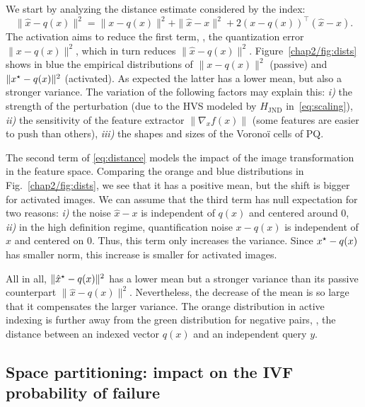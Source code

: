 We start by analyzing the distance estimate considered by the index:
\begin{equation}
    \|\hat{x}-q(x)\|^2 = \|x-q(x)\|^2 + \|\hat{x}-x\|^2
    + 2 (x-q(x))^\top (\hat{x}-x).
    \label{eq:distance}
\end{equation}
The activation aims to reduce the first term, \ie, the quantization error $\|x- q(x)\|^2$, which in turn reduces $\|\hat{x}- q(x)\|^2$. 
Figure~\ref{chap2/fig:dists} shows in blue the empirical distributions of $\|x- q(x)\|^2$ (passive) and $\|x^\star- q(x)\|^2$ (activated). 
As expected the latter has a lower mean, but also a stronger variance.
The variation of the following factors may explain this: \emph{i)} the strength of the perturbation (due to the HVS modeled by $H_{\mathrm{JND}}$ in~\eqref{eq:scaling}), \emph{ii)} the sensitivity of the feature extractor $\|\nabla_x f(x)\|$ (some features are easier to push than others), \emph{iii)} the shapes and sizes of the Voronoï cells of PQ.

The second term of \eqref{eq:distance} models the impact of the image transformation in the feature space. 
Comparing the orange and blue distributions in Fig.~\ref{chap2/fig:dists}, we see that it has a positive mean, but the shift is bigger for activated images.
We can assume that the third term has null expectation for two reasons: \emph{i)} the noise $\hat{x}-x$ is independent of $q(x)$ and centered around 0, \emph{ii)} in the high definition regime, quantification noise $x-q(x)$ is independent of $x$ and centered on 0. 
Thus, this term only increases the variance. 
Since $x^\star-q(x)$ has smaller norm, this increase is smaller for activated images.

All in all, $\|\hat{x}^\star-q(x)\|^2$ has a lower mean but a stronger variance than its passive counterpart $\|\hat{x}-q(x)\|^2$.
Nevertheless, the decrease of the mean is so large that it compensates the larger variance. 
The orange distribution in active indexing is further away from the green distribution for negative pairs, \ie, the distance between an indexed vector $q(x)$ and an independent query $y$.


\subsection[Space partitioning: impact on the IVF probability of failure]{Space partitioning: impact on the IVF \\probability of failure}\label{chap2/sec:space_partitioning}

